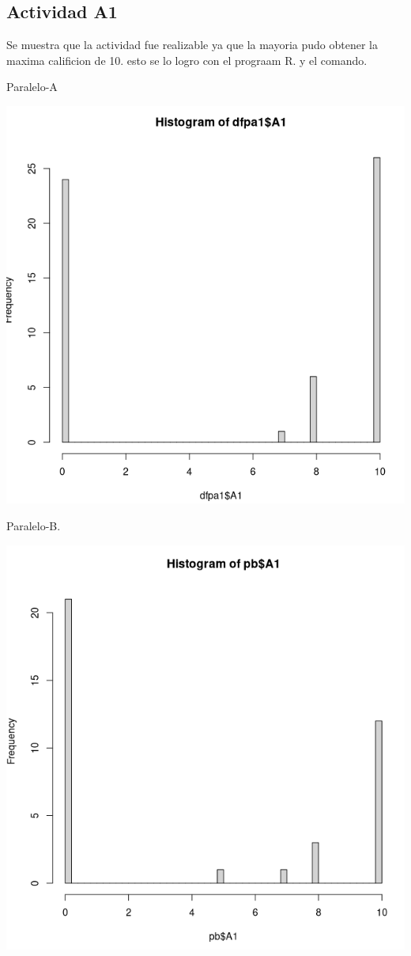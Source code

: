 \documentclass[a4pa<per,12pt,spanish]{article}
\begin{document}
\subsection{Actividad A1}
\label{sec:acctiviidad-A1}
Se muestra que la actividad fue realizable ya que la mayoria pudo obtener la maxima calificion de 10. esto se lo logro con el prograam R.  y el comando.\\


\begin{minipage}[h]{0.45\linewidth}
Paralelo-A

\includegraphics[scale=0.3]{images/histoA1.png}
\end{minipage}
\begin{minipage}[h]{0.45\linewidth}
Paralelo-B.

\includegraphics[scale=0.3]{images/histo-PB-A1.png}
\end{minipage}
\end{document}

